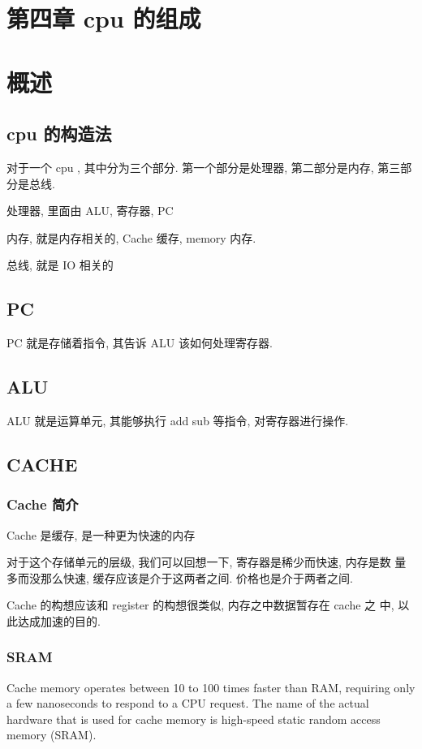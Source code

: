\documentclass[11pt]{ctexart}
\date{\today}
\title{}
\begin{document}
\tableofcontents

\section{第四章 cpu 的组成}
\label{sec:orgb5e09e0}
\section{}
\label{sec:org1c26d2f}
\section{概述}
\label{sec:orgdf6001f}
\subsection{cpu 的构造法}
\label{sec:org185961f}
对于一个 cpu , 其中分为三个部分. 第一个部分是处理器, 第二部分是内存,
第三部分是总线. 

处理器, 里面由 ALU, 寄存器, PC

内存, 就是内存相关的, Cache 缓存, memory 内存. 

总线, 就是 IO 相关的
\subsection{PC}
\label{sec:org5ce69cb}
PC 就是存储着指令, 其告诉 ALU 该如何处理寄存器. 

\subsection{ALU}
\label{sec:org656e6b3}
ALU 就是运算单元, 其能够执行 add sub 等指令, 对寄存器进行操作. 
\subsection{CACHE}
\label{sec:org56d4614}
\subsubsection{Cache 简介}
\label{sec:orgf9c85c1}
Cache 是缓存, 是一种更为快速的内存

对于这个存储单元的层级, 我们可以回想一下, 寄存器是稀少而快速, 内存是数
量多而没那么快速, 缓存应该是介于这两者之间. 价格也是介于两者之间. 

Cache 的构想应该和 register 的构想很类似, 内存之中数据暂存在 cache 之
中, 以此达成加速的目的. 
\subsubsection{SRAM}
\label{sec:org829d305}
Cache memory operates between 10 to 100 times faster than RAM,
requiring only a few nanoseconds to respond to a CPU request. The name
of the actual hardware that is used for cache memory is high-speed
static random access memory (SRAM).
\end{document}
